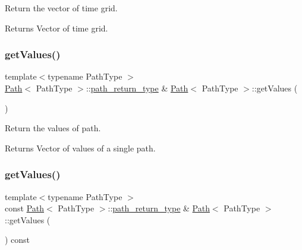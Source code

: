 Return the vector of time grid. 

\begin{DoxyReturn}{Returns}
Vector of time grid. 
\end{DoxyReturn}
\hypertarget{class_path_a8ba07fadae45801824240317c311bb84}{}\label{class_path_a8ba07fadae45801824240317c311bb84} 
\subsubsection{\texorpdfstring{get\+Values()}{getValues()}\hspace{0.1cm}{\footnotesize\ttfamily [1/2]}}
{\footnotesize\ttfamily template$<$typename Path\+Type $>$ \\
\hyperlink{class_path}{Path}$<$ Path\+Type $>$\+::\hyperlink{class_path_a3b1c34a87f7867f6fed2e0a33f801e7d}{path\+\_\+return\+\_\+type} \& \hyperlink{class_path}{Path}$<$ Path\+Type $>$\+::get\+Values (\begin{DoxyParamCaption}{ }\end{DoxyParamCaption})\hspace{0.3cm}{\ttfamily [virtual]}}



Return the values of path. 

\begin{DoxyReturn}{Returns}
Vector of values of a single path. 
\end{DoxyReturn}
\hypertarget{class_path_a2490ad69198170463f98c7d8f7212917}{}\label{class_path_a2490ad69198170463f98c7d8f7212917} 
\subsubsection{\texorpdfstring{get\+Values()}{getValues()}\hspace{0.1cm}{\footnotesize\ttfamily [2/2]}}
{\footnotesize\ttfamily template$<$typename Path\+Type $>$ \\
const \hyperlink{class_path}{Path}$<$ Path\+Type $>$\+::\hyperlink{class_path_a3b1c34a87f7867f6fed2e0a33f801e7d}{path\+\_\+return\+\_\+type} \& \hyperlink{class_path}{Path}$<$ Path\+Type $>$\+::get\+Values (\begin{DoxyParamCaption}{ }\end{DoxyParamCaption}) const\hspace{0.3cm}{\ttfamily [virtual]}}



